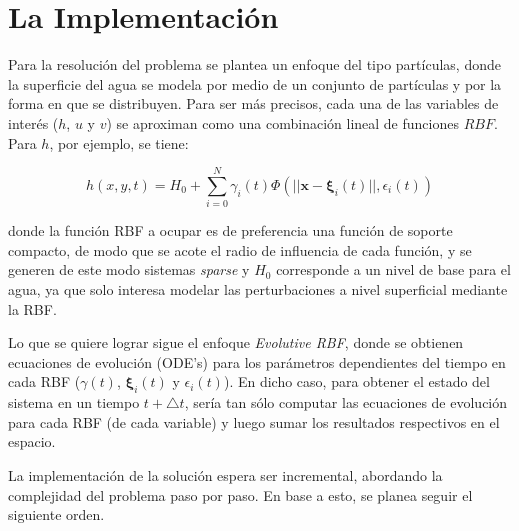 ﻿\documentclass[spanish, fleqn]{article}
\begin{document}
\section{La Implementación}
Para la resolución del problema se plantea un enfoque del tipo partículas, donde la superficie del agua se modela por medio 
de un conjunto de partículas y por la forma en que se distribuyen. Para ser más precisos, cada una de las variables de interés 
($h$, $u$ y $v$) se aproximan como una combinación lineal de funciones $RBF$. Para $h$, por ejemplo, se tiene:

$$h(x,y,t) = H_0 + \sum_{i=0}^{N} \gamma_i(t)\Phi(||\mathbf{x}-\boldsymbol{\xi}_i(t)||, \epsilon_i(t))$$
 
donde la función RBF a ocupar es de preferencia una función de soporte compacto, de modo que se acote el radio de influencia 
de cada función, y se generen de este modo sistemas \textit{sparse} y $H_0$ corresponde a un nivel de base para el agua, ya que solo interesa modelar las perturbaciones a nivel superficial mediante la RBF.

Lo que se quiere lograr sigue el enfoque \textit{Evolutive RBF}, donde se obtienen ecuaciones de evolución (ODE's) para los 
parámetros dependientes del tiempo en cada RBF ($\gamma(t)$, $\boldsymbol{\xi}_i(t)$ y $\epsilon_i(t)$). En dicho caso, para 
obtener el estado del sistema en un tiempo $t+\triangle t$, sería tan sólo computar las ecuaciones de evolución para cada RBF 
(de cada variable) y luego sumar los resultados respectivos en el espacio.

La implementación de la solución espera ser incremental, abordando la complejidad del problema paso por paso. En base a esto, se planea seguir el siguiente orden.
\end{document}

